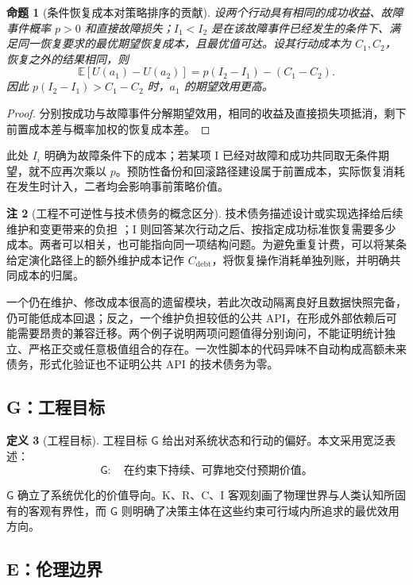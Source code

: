 \documentclass[11pt,a4paper]{ctexart}
\numberwithin{equation}{section}
\theoremstyle{definition}
\newtheorem{definition}{定义}[section]
\newtheorem{remark}[definition]{注}
\theoremstyle{plain}
\newtheorem{proposition}[definition]{命题}
\newcommand{\Goal}{\mathsf{G}}
\begin{document}
\begin{proposition}[条件恢复成本对策略排序的贡献]
设两个行动具有相同的成功收益、故障事件概率 $p>0$ 和直接故障损失；$I_1<I_2$ 是在该故障事件已经发生的条件下、满足同一恢复要求的最优期望恢复成本，且最优值可达。设其行动成本为 $C_1,C_2$，恢复之外的结果相同，则
\[
\mathbb E[U(a_1)-U(a_2)]
=p(I_2-I_1)-(C_1-C_2).
\]
因此 $p(I_2-I_1)>C_1-C_2$ 时，$a_1$ 的期望效用更高。
\end{proposition}
\begin{proof}
分别按成功与故障事件分解期望效用，相同的收益及直接损失项抵消，剩下前置成本差与概率加权的恢复成本差。
\end{proof}
此处 $I_i$ 明确为故障条件下的成本；若某项 I 已经对故障和成功共同取无条件期望，就不应再次乘以 $p$。预防性备份和回滚路径建设属于前置成本，实际恢复消耗在发生时计入，二者均会影响事前策略价值。

\begin{remark}[工程不可逆性与技术债务的概念区分]
\label{prop:debt-vs-irreversibility}
技术债务描述设计或实现选择给后续维护和变更带来的负担 \cite{cunningham1992,avgeriou2016}；I 则回答某次行动之后、按指定成功标准恢复需要多少成本。两者可以相关，也可能指向同一项结构问题。为避免重复计费，可以将某条给定演化路径上的额外维护成本记作 $C_{\mathrm{debt}}$，将恢复操作消耗单独列账，并明确共同成本的归属。

一个仍在维护、修改成本很高的遗留模块，若此次改动隔离良好且数据快照完备，仍可能低成本回退；反之，一个维护负担较低的公共 API，在形成外部依赖后可能需要昂贵的兼容迁移。两个例子说明两项问题值得分别询问，不能证明统计独立、严格正交或任意极值组合的存在。一次性脚本的代码异味不自动构成高额未来债务，形式化验证也不证明公共 API 的技术债务为零。
\end{remark}

\subsection{G：工程目标}

\begin{definition}[工程目标]
工程目标 $\Goal$ 给出对系统状态和行动的偏好。本文采用宽泛表述：
\[
\Goal:\quad
\text{在约束下持续、可靠地交付预期价值。}
\]
\end{definition}

$\Goal$ 确立了系统优化的价值导向。K、R、C、I 客观刻画了物理世界与人类认知所固有的客观有界性，而 $\Goal$ 则明确了决策主体在这些约束可行域内所追求的最优效用方向。

\subsection{E：伦理边界}
\end{document}
